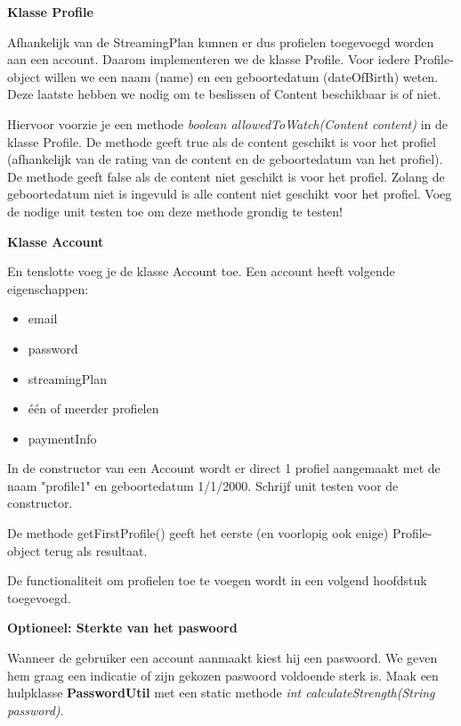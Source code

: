\begin{oefening}
\textbf{Klasse Profile}

Afhankelijk van de StreamingPlan kunnen er dus profielen toegevoegd worden aan een account. Daarom implementeren we de klasse Profile. Voor iedere Profile-object willen we een naam (name) en een geboortedatum (dateOfBirth) weten. Deze laatste hebben we nodig om te beslissen of Content beschikbaar is of niet. 

Hiervoor voorzie je een methode \textit{boolean allowedToWatch(Content content)} in de klasse Profile. De methode geeft true als de content geschikt is voor het profiel (afhankelijk van de rating van de content en de geboortedatum van het profiel). 
De methode geeft false als de content niet geschikt is voor het profiel.
Zolang de geboortedatum niet is ingevuld is alle content niet geschikt voor het profiel.
Voeg de nodige unit testen toe om deze methode grondig te testen!

\textbf{Klasse Account}

En tenslotte voeg je de klasse Account toe. Een account heeft volgende eigenschappen:
\begin{itemize}
\item email
\item password
\item streamingPlan
\item \'e\'en of meerder profielen
\item paymentInfo
\end{itemize}

In de constructor van een Account wordt er direct 1 profiel aangemaakt met de naam "profile1" en geboortedatum 1/1/2000. Schrijf unit testen voor de constructor.

De methode getFirstProfile() geeft het eerste (en voorlopig ook enige) Profile-object terug als resultaat. 

De functionaliteit om profielen toe te voegen wordt in een volgend hoofdstuk toegevoegd.

\textbf{Optioneel: Sterkte van het paswoord}

Wanneer de gebruiker een account aanmaakt kiest hij een paswoord. We geven hem graag een indicatie of zijn gekozen paswoord voldoende sterk is.
Maak een hulpklasse \textbf{PasswordUtil}  met een static methode \textit{int calculateStrength(String password)}. 


\end{oefening}
